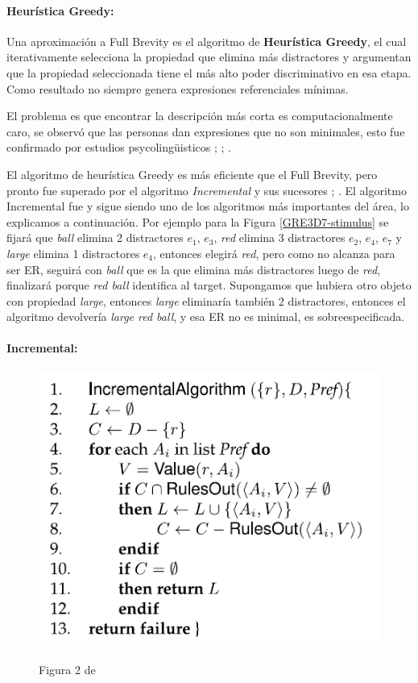 \paragraph{Heur\'istica Greedy:} Una aproximaci\'on a Full Brevity es el algoritmo de {\bf Heur\'istica Greedy}, el cual iterativamente selecciona la propiedad que elimina m\'as distractores y argumentan que la propiedad seleccionada tiene el m\'as alto poder discriminativo en esa etapa. Como resultado no siempre genera expresiones referenciales m\'inimas.

El problema es que encontrar la descripci\'on m\'as corta es computacionalmente caro, se observ\'o que las personas dan expresiones que no son minimales, esto fue confirmado por estudios psycoling\"uisticos \cite{Olson1970LangAndThought};  \cite{Sonnenschein1984}; \cite{Pechmann1989}.

El algoritmo de heur\'istica Greedy es m\'as eficiente que el Full Brevity, pero pronto fue superado por el algoritmo {\it Incremental} y sus sucesores \cite{C92-1038}; \cite{Dale95computationalinterpretations}. El algoritmo Incremental fue y sigue siendo uno de los algoritmos m\'as importantes del \'area, lo explicamos a continuaci\'on. Por ejemplo para la Figura \ref{GRE3D7-stimulus} se fijar\'a que {\it ball} elimina 2 distractores {$e_{1}$, $e_{3}$}, {\it red} elimina 3 distractores {$e_{2}$, $e_{4}$, $e_{7}$} y {\it large} elimina 1 distractores {$e_{4}$}, entonces elegir\'a {\it red}, pero como no alcanza para ser ER, seguir\'a con {\it ball} que es la que elimina m\'as distractores luego de {\it red}, finalizar\'a porque {\it red ball} identifica al target. Supongamos que hubiera otro objeto con propiedad {\it large}, entonces {\it large} eliminar\'ia tambi\'en 2 distractores, entonces el algoritmo devolver\'ia {\it large red ball}, y esa ER no es minimal, es sobreespecificada.

\paragraph{Incremental:}

\begin{figure}[ht]
\includegraphics[width=.5\textwidth]{images/algoritmoIncremental.png}
\label{algoritmoIncremental}
\caption{Figura 2 de \protect\cite{survey}}
\end{figure}

